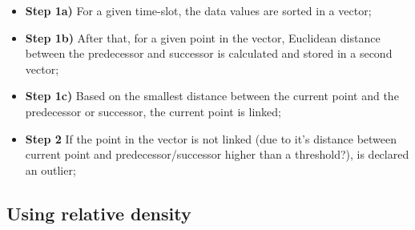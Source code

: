\begin{itemize}

	\setlength\itemsep{-0.5em}

	\item \textbf{Step 1a)} For a given time-slot, the data values are sorted in a vector;

	\item \textbf{Step 1b)} After that, for a given point in the vector, Euclidean distance between the predecessor and successor is calculated and stored in a second vector;

	\item \textbf{Step 1c)} Based on the smallest distance between the current point and the predecessor or successor, the current point is linked;

	\item \textbf{Step 2} If the point in the vector is not linked (due to it's distance between current point and predecessor/successor higher than a threshold?), is declared an outlier;

\end{itemize}





\subsection{Using relative density}

\lipsum[1]